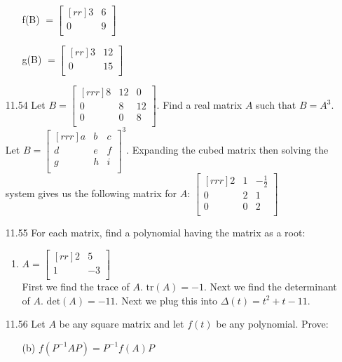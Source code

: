 \documentclass[12pt]{article}
\theoremstyle{definition}
\theoremstyle{plain}
\begin{document}
\begin{enumerate}
\begin{enumerate}
	\item[f(B)]$=\begin{bmatrix}[rr]3&6\\0&9\\\end{bmatrix}$
	\item[g(B)]$=\begin{bmatrix}[rr]3&12\\0&15\\\end{bmatrix}$
	\end{enumerate}
\item[11.54]Let $B=\begin{bmatrix}[rrr]8&12&0\\0&8&12\\0&0&8\\\end{bmatrix}$. Find a real matrix $A$ such that $B=A^3$.\\
	Let $B = \begin{bmatrix}[rrr]a&b&c\\d&e&f\\g&h&i\\\end{bmatrix}^3$.
	Expanding the cubed matrix then solving the system gives us the following matrix for $A$: $\begin{bmatrix}[rrr]2&1&-\frac{1}{2}\\0&2&1\\0&0&2\\\end{bmatrix}$

\item[11.55]For each matrix, find a polynomial having the matrix as a root:
	\begin{enumerate}
	\item $A=\begin{bmatrix}[rr]2&5\\1&-3\\\end{bmatrix}$\\
	First we find the trace of $A$. $\mathrm{tr}(A)=-1$. Next we find the determinant of $A$. $\mathrm{det}(A)=-11$. Next we plug this into $\Delta (t) = t^2+t-11$.
	\end{enumerate}
	
\item[11.56]Let $A$ be any square matrix and let $f(t)$ be any polynomial. Prove:
	\begin{enumerate}
	\item[(b)] $f(P^{-1}AP)=P^{-1}f(A)P$
	\end{enumerate}
			

\end{enumerate}
\end{document}
